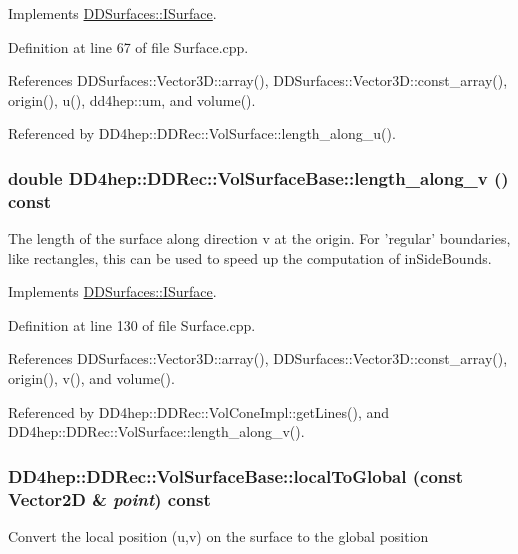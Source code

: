 Implements \hyperlink{class_d_d_surfaces_1_1_i_surface_a0060710912d3447e296a8e0875690cc9}{DDSurfaces::ISurface}.

Definition at line 67 of file Surface.cpp.

References DDSurfaces::Vector3D::array(), DDSurfaces::Vector3D::const\_\-array(), origin(), u(), dd4hep::um, and volume().

Referenced by DD4hep::DDRec::VolSurface::length\_\-along\_\-u().\hypertarget{class_d_d4hep_1_1_d_d_rec_1_1_vol_surface_base_a28732fc0788f9f53c3811303b852b470}{
\subsubsection[{length\_\-along\_\-v}]{\setlength{\rightskip}{0pt plus 5cm}double DD4hep::DDRec::VolSurfaceBase::length\_\-along\_\-v () const}}
\label{class_d_d4hep_1_1_d_d_rec_1_1_vol_surface_base_a28732fc0788f9f53c3811303b852b470}
The length of the surface along direction v at the origin. For 'regular' boundaries, like rectangles, this can be used to speed up the computation of inSideBounds. 

Implements \hyperlink{class_d_d_surfaces_1_1_i_surface_a9a4682bfa68557d53cfd319cfa54148d}{DDSurfaces::ISurface}.

Definition at line 130 of file Surface.cpp.

References DDSurfaces::Vector3D::array(), DDSurfaces::Vector3D::const\_\-array(), origin(), v(), and volume().

Referenced by DD4hep::DDRec::VolConeImpl::getLines(), and DD4hep::DDRec::VolSurface::length\_\-along\_\-v().\hypertarget{class_d_d4hep_1_1_d_d_rec_1_1_vol_surface_base_a62f5625f6f620535765193e97990fb1d}{
\subsubsection[{localToGlobal}]{ DD4hep::DDRec::VolSurfaceBase::localToGlobal (const {\bf Vector2D} \& {\em point}) const}}
\label{class_d_d4hep_1_1_d_d_rec_1_1_vol_surface_base_a62f5625f6f620535765193e97990fb1d}
Convert the local position (u,v) on the surface to the global position 

